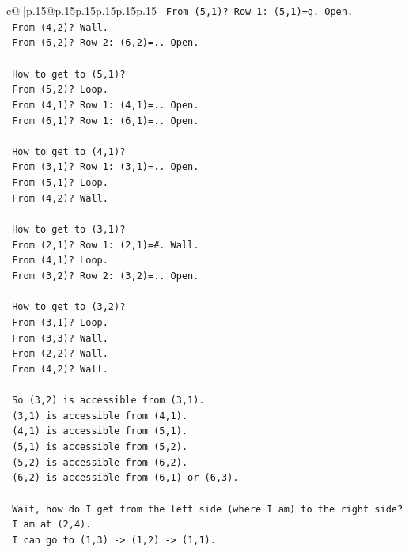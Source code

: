 \documentclass{article}
\begin{document}
{\begin{supertabular}{c@{$\;$}|p{.15\linewidth}@{}p{.15\linewidth}p{.15\linewidth}p{.15\linewidth}p{.15\linewidth}p{.15\linewidth}}
{{{\texttt{   From (5,1)? Row 1: (5,1)=q. Open.} \\
\texttt{   From (4,2)? Wall.} \\
\texttt{   From (6,2)? Row 2: (6,2)=.. Open.} \\
\\ 
\texttt{   How to get to (5,1)?} \\
\texttt{   From (5,2)? Loop.} \\
\texttt{   From (4,1)? Row 1: (4,1)=.. Open.} \\
\texttt{   From (6,1)? Row 1: (6,1)=.. Open.} \\
\\ 
\texttt{   How to get to (4,1)?} \\
\texttt{   From (3,1)? Row 1: (3,1)=.. Open.} \\
\texttt{   From (5,1)? Loop.} \\
\texttt{   From (4,2)? Wall.} \\
\\ 
\texttt{   How to get to (3,1)?} \\
\texttt{   From (2,1)? Row 1: (2,1)=\#. Wall.} \\
\texttt{   From (4,1)? Loop.} \\
\texttt{   From (3,2)? Row 2: (3,2)=.. Open.} \\
\\ 
\texttt{   How to get to (3,2)?} \\
\texttt{   From (3,1)? Loop.} \\
\texttt{   From (3,3)? Wall.} \\
\texttt{   From (2,2)? Wall.} \\
\texttt{   From (4,2)? Wall.} \\
\\ 
\texttt{   So (3,2) is accessible from (3,1).} \\
\texttt{   (3,1) is accessible from (4,1).} \\
\texttt{   (4,1) is accessible from (5,1).} \\
\texttt{   (5,1) is accessible from (5,2).} \\
\texttt{   (5,2) is accessible from (6,2).} \\
\texttt{   (6,2) is accessible from (6,1) or (6,3).} \\
\\ 
\texttt{   Wait, how do I get from the left side (where I am) to the right side?} \\
\texttt{   I am at (2,4).} \\
\texttt{   I can go to (1,3) {-}> (1,2) {-}> (1,1).} \\
}}}
\end{supertabular}}
\end{document}
